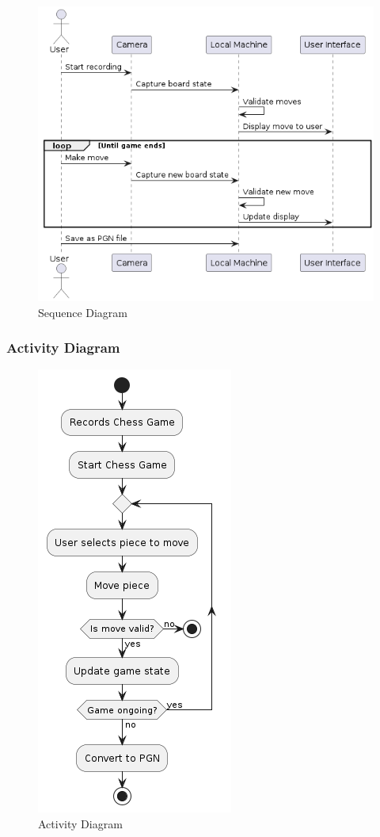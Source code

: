 \begin{figure}[h!]
    \centering
    \includegraphics[width=0.75\linewidth]{figures/uml/sequence.png}
    \caption[Sequence Diagram]{Sequence Diagram}
    \label{fig:sequence}
\end{figure}

\subsubsection*{Activity Diagram}
\label{subsubsec:activity-diagram}

\begin{figure}[h!]
    \centering
    \includegraphics[height=0.75\linewidth]{figures/uml/activity.png}
    \caption[Activity Diagram]{Activity Diagram}
    \label{fig:activity}
\end{figure}

